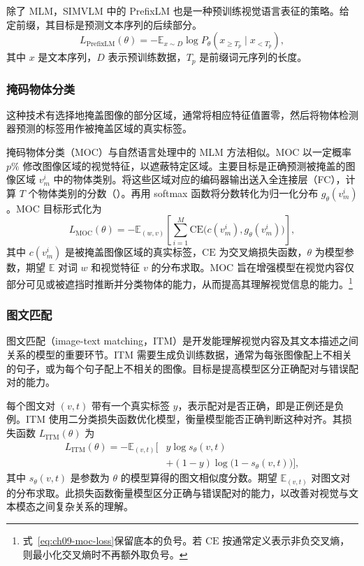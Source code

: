 除了 MLM，SIMVLM 中的 PrefixLM 也是一种预训练视觉语言表征的策略。给定前缀，其目标是预测文本序列的后续部分。
\begin{equation}
L_{\mathrm{PrefixLM}}(\theta)=-\mathbb{E}_{x\sim D}
\log P_\theta(x_{\geq T_p}\mid x_{<T_p}),
\label{eq:ch09-prefixlm-loss}
\end{equation}
其中 $x$ 是文本序列，$D$ 表示预训练数据，$T_p$ 是前缀词元序列的长度。

\subsubsection{掩码物体分类}
这种技术有选择地掩盖图像的部分区域，通常将相应特征值置零，然后将物体检测器预测的标签用作被掩盖区域的真实标签。

掩码物体分类（MOC）与自然语言处理中的 MLM 方法相似。MOC 以一定概率 $p\%$ 修改图像区域的视觉特征，以遮蔽特定区域。主要目标是正确预测被掩盖的图像区域 $v_m^i$ 中的物体类别。将这些区域对应的编码器输出送入全连接层（FC），计算 $T$ 个物体类别的分数（）。再用 softmax 函数将分数转化为归一化分布 $g_\theta(v_m^i)$。MOC 目标形式化为
\begin{equation}
L_{\mathrm{MOC}}(\theta)=-\mathbb{E}_{(w,v)}
\left[\sum_{i=1}^M \mathrm{CE}\bigl(c(v_m^i),g_\theta(v_m^i)\bigr)\right],
\label{eq:ch09-moc-loss}
\end{equation}
其中 $c(v_m^i)$ 是被掩盖图像区域的真实标签，$\mathrm{CE}$ 为交叉熵损失函数，$\theta$ 为模型参数，期望 $\mathbb{E}$ 对词 $w$ 和视觉特征 $v$ 的分布求取。MOC 旨在增强模型在视觉内容仅部分可见或被遮挡时推断并分类物体的能力，从而提高其理解视觉信息的能力。\footnote{式~\eqref{eq:ch09-moc-loss}保留底本的负号。若 $\mathrm{CE}$ 按通常定义表示非负交叉熵，则最小化交叉熵时不再额外取负号。}

\subsubsection{图文匹配}
图文匹配（image-text matching，ITM）是开发能理解视觉内容及其文本描述之间关系的模型的重要环节。ITM 需要生成负训练数据，通常为每张图像配上不相关的句子，或为每个句子配上不相关的图像。目标是提高模型区分正确配对与错误配对的能力。

每个图文对 $(v,t)$ 带有一个真实标签 $y$，表示配对是否正确，即是正例还是负例。ITM 使用二分类损失函数优化模型，衡量模型能否正确判断这种对齐。其损失函数 $L_{\mathrm{ITM}}(\theta)$ 为
\begin{equation}
\begin{aligned}
L_{\mathrm{ITM}}(\theta)=-\mathbb{E}_{(v,t)}
\bigl[&y\log s_\theta(v,t)\\
&+(1-y)\log\bigl(1-s_\theta(v,t)\bigr)\bigr],
\end{aligned}
\label{eq:ch09-itm-loss}
\end{equation}
其中 $s_\theta(v,t)$ 是参数为 $\theta$ 的模型算得的图文相似度分数。期望 $\mathbb{E}_{(v,t)}$ 对图文对的分布求取。此损失函数衡量模型区分正确与错误配对的能力，以改善对视觉与文本模态之间复杂关系的理解。

